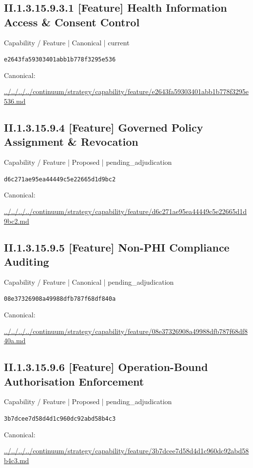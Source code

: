 \documentclass[10pt,a4paper]{article}
\begin{document}
\subsection*{II.1.3.15.9.3.1 [Feature] Health Information Access \& Consent Control}
{\small Capability / Feature | Canonical | current}\par
\texttt{e2643fa59303401abb1b778f3295e536}\par
Canonical: \par
{\footnotesize\url{../../../../continuum/strategy/capability/feature/e2643fa59303401abb1b778f3295e536.md}}\par
\subsection*{II.1.3.15.9.4 [Feature] Governed Policy Assignment \& Revocation}
{\small Capability / Feature | Proposed | pending\_adjudication}\par
\texttt{d6c271ae95ea44449c5e22665d1d9bc2}\par
Canonical: \par
{\footnotesize\url{../../../../continuum/strategy/capability/feature/d6c271ae95ea44449c5e22665d1d9bc2.md}}\par
\subsection*{II.1.3.15.9.5 [Feature] Non-PHI Compliance Auditing}
{\small Capability / Feature | Canonical | pending\_adjudication}\par
\texttt{08e37326908a49988dfb787f68df840a}\par
Canonical: \par
{\footnotesize\url{../../../../continuum/strategy/capability/feature/08e37326908a49988dfb787f68df840a.md}}\par
\subsection*{II.1.3.15.9.6 [Feature] Operation-Bound Authorisation Enforcement}
{\small Capability / Feature | Proposed | pending\_adjudication}\par
\texttt{3b7dcee7d58d4d1c960dc92abd58b4c3}\par
Canonical: \par
{\footnotesize\url{../../../../continuum/strategy/capability/feature/3b7dcee7d58d4d1c960dc92abd58b4c3.md}}\par
\end{document}
